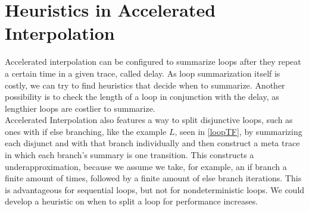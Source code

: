 \section{Heuristics in Accelerated Interpolation}
Accelerated interpolation can be configured to summarize loops after they repeat a certain time in a given trace, called delay. As loop summarization itself is costly, we can try to find heuristics that decide when to summarize. Another possibility is to check the length of a loop in conjunction with the delay, as lengthier loops are costlier to summarize. \\
Accelerated Interpolation also features a way to split disjunctive loops, such as ones with if else branching, like the example $L$, seen in \ref{loopTF}, by summarizing each disjunct and with that branch individually and then construct a meta trace in which each branch's summary is one transition. This constructs a underapproximation, because we assume we take, for example, an if branch a finite amount of times, followed by a finite amount of else branch iterations. This is advantageous for sequential loops, but not for nondeterministic loops. We could develop a heuristic on when to split a loop for performance increases.

\begin{comment}
	To compute a loop summary from a \qvasrs, one has to calculate the reachability relation of the automaton. Haase and Halfon \cite{DBLP:conf/rp/HaaseH14} proposed a polytime procedure that computes a series of formulas from computed Parikh images that, as conjunction, form a summary of the system. This procedure can be adapted to work with \qvasrs
\end{comment}
